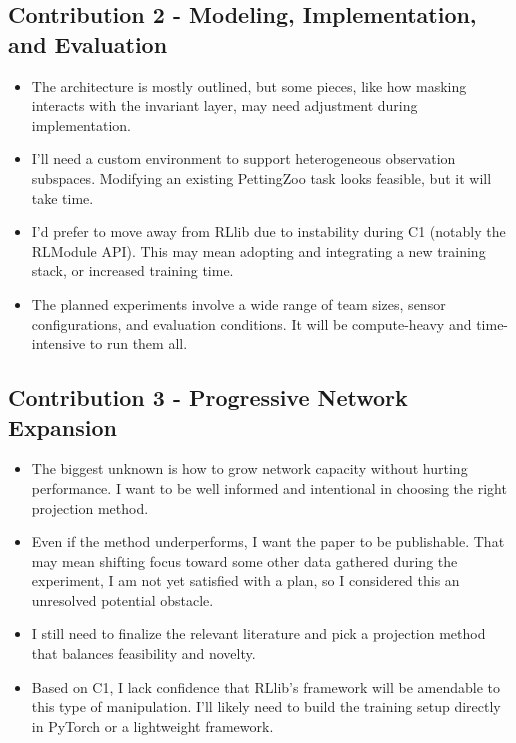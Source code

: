 \subsection*{Contribution 2 - Modeling, Implementation, and Evaluation}
\begin{itemize}
    \item The architecture is mostly outlined, but some pieces, like how masking 
        interacts with the invariant layer, may need adjustment during implementation.
    \item I'll need a custom environment to support heterogeneous observation subspaces. 
        Modifying an existing PettingZoo task looks feasible, but it will take time.
    \item I'd prefer to move away from RLlib due to instability during C1 
        (notably the RLModule API). This may mean adopting and integrating a new training stack,
        or increased training time.
    \item The planned experiments involve a wide range of team sizes, 
        sensor configurations, and evaluation conditions. 
        It will be compute-heavy and time-intensive to run them all.
\end{itemize}

\subsection*{Contribution 3 - Progressive Network Expansion}
\begin{itemize}
    \item The biggest unknown is how to grow network capacity without hurting performance. 
        I want to be well informed and intentional in choosing the right projection method.
    \item Even if the method underperforms, I want the paper to be publishable. 
        That may mean shifting focus toward some other data gathered during the experiment,
        I am not yet satisfied with a plan, so I considered this an unresolved potential obstacle.
    \item I still need to finalize the relevant literature and pick a projection 
        method that balances feasibility and novelty.
    \item Based on C1, I lack confidence that RLlib's framework will be amendable to this type of
        manipulation. I'll likely need to build the training setup directly in 
        PyTorch or a lightweight framework.
\end{itemize}
